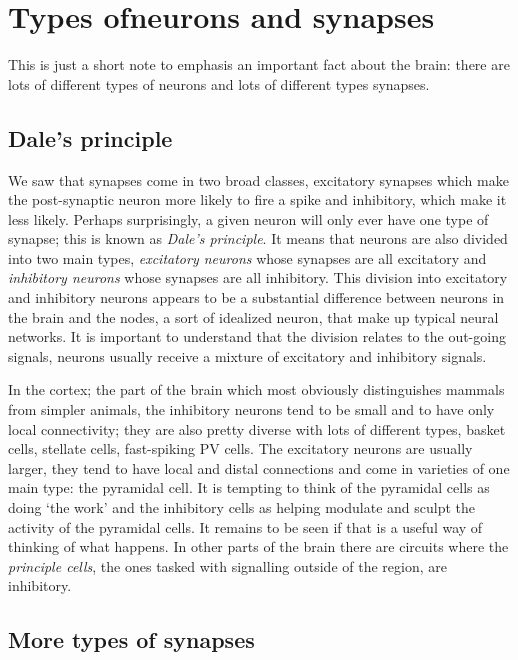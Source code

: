 \documentclass[12pt]{article}
\begin{document}
\section*{Types ofneurons and synapses}

This is just a short note to emphasis an important fact about the
brain: there are lots of different types of neurons and lots of
different types synapses.

\subsection*{Dale's principle}

We saw that synapses come in two broad classes, excitatory synapses
which make the post-synaptic neuron more likely to fire a spike and
inhibitory, which make it less likely. Perhaps surprisingly, a given
neuron will only ever have one type of synapse; this is known as
\textsl{Dale's principle}. It means that neurons are also divided into
two main types, \textsl{excitatory neurons} whose synapses are all
excitatory and \textsl{inhibitory neurons} whose synapses are all
inhibitory. This division into excitatory and inhibitory neurons
appears to be a substantial difference between neurons in the brain
and the nodes, a sort of idealized neuron, that make up typical neural
networks. It is important to understand that the division relates to
the out-going signals, neurons usually receive a mixture of excitatory
and inhibitory signals.

In the cortex; the part of the brain which most obviously
distinguishes mammals from simpler animals, the inhibitory neurons
tend to be small and to have only local connectivity; they are also
pretty diverse with lots of different types, basket cells, stellate
cells, fast-spiking PV cells. The excitatory neurons are usually
larger, they tend to have local and distal connections and come in
varieties of one main type: the pyramidal cell. It is tempting to
think of the pyramidal cells as doing `the work' and the inhibitory
cells as helping modulate and sculpt the activity of the pyramidal
cells. It remains to be seen if that is a useful way of thinking of
what happens. In other parts of the brain there are circuits where the
\textsl{principle cells}, the ones tasked with signalling outside of
the region, are inhibitory.


\subsection*{More types of synapses}
\end{document}
